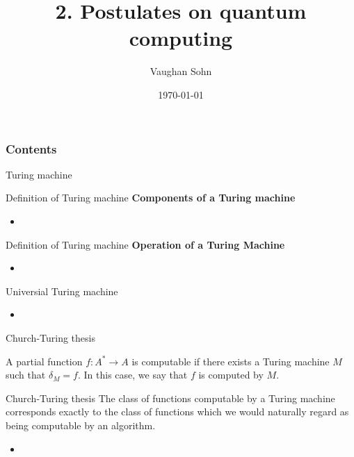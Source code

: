 \documentclass[9pt]{beamer}
\title{2. Postulates on quantum computing}
\date{\today}
\author{Vaughan Sohn}
\begin{document}
    \maketitle
    
    \begin{frame}
        \frametitle{Contents}
        \tableofcontents
    \end{frame}


    \begin{section}{Turing machine}
        \begin{frame}{Definition of Turing machine}
            \textbf{Components of a Turing machine}
            \begin{itemize}
                \item 
            \end{itemize}
        \end{frame}

        \begin{frame}{Definition of Turing machine}
            \textbf{Operation of a Turing Machine}
            \begin{itemize}
                \item 
            \end{itemize}
        \end{frame}

        \begin{frame}{Universial Turing machine}
            \begin{itemize}
                \item 
            \end{itemize}
        \end{frame}

        \begin{frame}{Church-Turing thesis}
            \begin{definition}
                A partial function $f: A^* \rightarrow A$ is computable if there exists a Turing machine $M$ such that $\delta_M = f$. In this case, we say that $f$ is computed by $M$.
            \end{definition}
            \begin{block}{Church-Turing thesis}
                The class of functions computable by a Turing machine corresponds exactly to the class of functions which we would naturally regard as being computable by an algorithm.
            \end{block}
            \begin{itemize}
                \item 
            \end{itemize}
        \end{frame}
        

\end{section}
\end{document}
